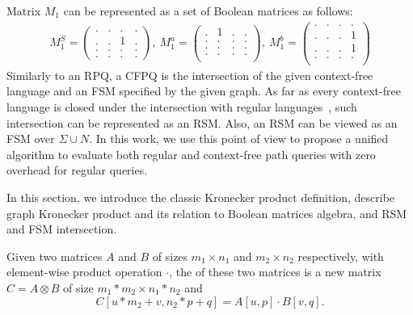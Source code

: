 Matrix $M_1$ can be represented as a set of Boolean matrices as follows:
{\scriptsize
\begin{align*}
M_1^S =
\begin{pmatrix}
    . & . & . & .   \\
    . & . & 1 & .   \\
    . & . & . & .   \\
    . & . & . & .
\end{pmatrix},~M_1^a =
\begin{pmatrix}
   . & 1 & . & .   \\
   . & . & . & .   \\
   . & . & . & .   \\
   . & . & . & .   \\
\end{pmatrix},~M_1^b =
\begin{pmatrix}
    . & . & . & .   \\
    . & . & . & 1   \\
    . & . & . & 1   \\
    . & . & . & .   \\
\end{pmatrix}
\end{align*}
}
Similarly to an RPQ, a CFPQ is the intersection of the given context-free language and an FSM specified by the given graph.
As far as every context-free language is closed under the intersection with regular languages~\cite{automata:theory:10.5555/1177300}, such intersection can be represented as an RSM.
Also, an RSM can be viewed as an FSM over $\Sigma \cup N$.
In this work, we use this point of view to propose a unified algorithm to evaluate both regular and context-free path queries with zero overhead for regular queries.


In this section, we introduce the classic Kronecker product definition,
describe graph Kronecker product and its relation to Boolean matrices algebra,
and RSM and FSM intersection.

\begin{definition}
Given two matrices $A$ and $B$ of sizes $m_1 \times n_1$ and $m_2 \times n_2$
respectively, with element-wise product operation $\cdot$, the  of these two matrices is a new matrix $C = A \otimes B$ of size $m_1 * m_2 \times n_1 * n_2$ and \[C[u * m_2 + v,n_2 * p + q] = A[u,p] \cdot B[v,q].\]
\end{definition}

